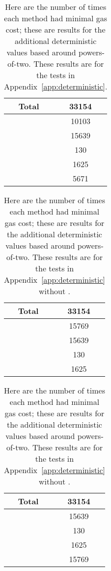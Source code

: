 \begin{table}[p]
\centering
\begin{tabular}{|c|S[table-format=5.0]|}
\hline
Total & 33154 \\
\hline
{} \UnrolledThree{} &  10103 \\
 \WhileOne{}      &  15639 \\
\WhileTwo{}      &   130 \\
\WhileThree{}    &  1625 \\
 \Linear{}        &   5671 \\
\hline
\end{tabular}
\caption[Minimal Gas Costs Statistics]{Here are the number of times
    each method had minimal gas cost;
    these are results for the additional deterministic values
    based around powers-of-two.
    These results are for the tests in Appendix~\ref{app:deterministic}.
    }
\label{table:minimal_gas_costs_ed}
\end{table}

\begin{table}[p]
\centering
\begin{tabular}{|c|S[table-format=5.0]|}
\hline
Total & 33154 \\
\hline
{} \UnrolledThree{} &  15769 \\
 \WhileOne{}      &  15639 \\
\WhileTwo{}      &   130 \\
\WhileThree{}    &  1625 \\
\hline
\end{tabular}
\caption[Minimal Gas Costs Statistics]{Here are the number of times
    each method had minimal gas cost;
    these are results for the additional deterministic values
    based around powers-of-two.
    These results are for the tests in Appendix~\ref{app:deterministic}
    without \Linear{}.
    }
\label{table:minimal_gas_costs_ed_no_linear}
\end{table}

\begin{table}[p]
\centering
\begin{tabular}{|c|S[table-format=5.0]|}
\hline
Total & 33154 \\
\hline
{} \WhileOne{} &  15639 \\
\WhileTwo{}      &   130 \\
\WhileThree{}    &  1625 \\
 \Linear{}   &  15769 \\
\hline
\end{tabular}
\caption[Minimal Gas Costs Statistics]{Here are the number of times
    each method had minimal gas cost;
    these are results for the additional deterministic values
    based around powers-of-two.
    These results are for the tests in Appendix~\ref{app:deterministic}
    without \UnrolledThree{}.
    }
\label{table:minimal_gas_costs_ed_no_unrolled}
\end{table}

